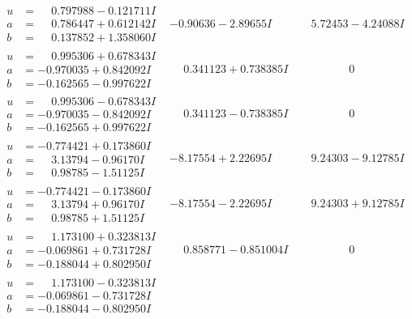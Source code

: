 \documentclass[1p]{elsarticle_modified}
\theoremstyle{definition}
\begin{document}
$$\begin{array}{c|c|c}
\begin{aligned}
u &= \phantom{-}0.797988 - 0.121711 I \\
a &= \phantom{-}0.786447 + 0.612142 I \\
b &= \phantom{-}0.137852 + 1.358060 I\end{aligned}
 & -0.90636 - 2.89655 I & \phantom{-}5.72453 - 4.24088 I \\ \hline\begin{aligned}
u &= \phantom{-}0.995306 + 0.678343 I \\
a &= -0.970035 + 0.842092 I \\
b &= -0.162565 - 0.997622 I\end{aligned}
 & \phantom{-}0.341123 + 0.738385 I & \phantom{-0.000000 } 0 \\ \hline\begin{aligned}
u &= \phantom{-}0.995306 - 0.678343 I \\
a &= -0.970035 - 0.842092 I \\
b &= -0.162565 + 0.997622 I\end{aligned}
 & \phantom{-}0.341123 - 0.738385 I & \phantom{-0.000000 } 0 \\ \hline\begin{aligned}
u &= -0.774421 + 0.173860 I \\
a &= \phantom{-}3.13794 - 0.96170 I \\
b &= \phantom{-}0.98785 - 1.51125 I\end{aligned}
 & -8.17554 + 2.22695 I & \phantom{-}9.24303 - 9.12785 I \\ \hline\begin{aligned}
u &= -0.774421 - 0.173860 I \\
a &= \phantom{-}3.13794 + 0.96170 I \\
b &= \phantom{-}0.98785 + 1.51125 I\end{aligned}
 & -8.17554 - 2.22695 I & \phantom{-}9.24303 + 9.12785 I \\ \hline\begin{aligned}
u &= \phantom{-}1.173100 + 0.323813 I \\
a &= -0.069861 + 0.731728 I \\
b &= -0.188044 + 0.802950 I\end{aligned}
 & \phantom{-}0.858771 - 0.851004 I & \phantom{-0.000000 } 0 \\ \hline\begin{aligned}
u &= \phantom{-}1.173100 - 0.323813 I \\
a &= -0.069861 - 0.731728 I \\
b &= -0.188044 - 0.802950 I\end{aligned}

\end{array}$$
\end{document}
